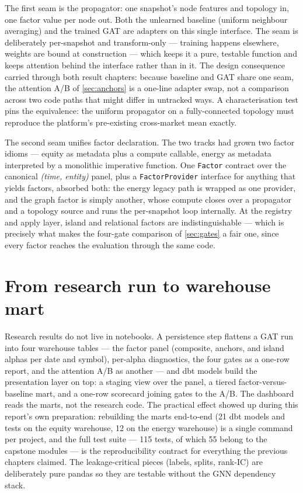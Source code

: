 The first seam is the propagator: one snapshot's node features and
topology in, one factor value per node out. Both the unlearned baseline
(uniform neighbour averaging) and the trained GAT are adapters on this
single interface. The seam is deliberately per-snapshot and
transform-only --- training happens elsewhere, weights are bound at
construction --- which keeps it a pure, testable function and keeps
attention behind the interface rather than in it. The design consequence
carried through both result chapters: because baseline and GAT share one
seam, the attention A/B of \cref{sec:anchors} is a one-line adapter
swap, not a comparison across two code paths that might differ in
untracked ways. A characterisation test pins the equivalence: the
uniform propagator on a fully-connected topology must reproduce the
platform's pre-existing cross-market mean exactly.

The second seam unifies factor declaration. The two tracks had grown two
factor idioms --- equity as metadata plus a compute callable, energy as
metadata interpreted by a monolithic imperative function. One
\texttt{Factor} contract over the canonical \emph{(time, entity)} panel,
plus a \texttt{FactorProvider} interface for anything that yields
factors, absorbed both: the energy legacy path is wrapped as one
provider, and the graph factor is simply another, whose compute closes
over a propagator and a topology source and runs the per-snapshot loop
internally. At the registry and apply layer, island and relational
factors are indistinguishable --- which is precisely what makes the
four-gate comparison of \cref{sec:gates} a fair one, since every factor
reaches the evaluation through the same code.

\section{From research run to warehouse mart}
\label{sec:pl-loop}

Research results do not live in notebooks. A persistence step flattens a
GAT run into four warehouse tables --- the factor panel (composite,
anchors, and island alphas per date and symbol), per-alpha diagnostics,
the four gates as a one-row report, and the attention A/B as another ---
and dbt models build the presentation layer on top: a staging view over
the panel, a tiered factor-versus-baseline mart, and a one-row scorecard
joining gates to the A/B. The dashboard reads the marts, not the
research code. The practical effect showed up during this report's own
preparation: rebuilding the marts end-to-end (21 dbt models and tests on
the equity warehouse, 12 on the energy warehouse) is a single command
per project, and the full test suite --- 115 tests, of which 55 belong
to the capstone modules --- is the reproducibility contract for
everything the previous chapters claimed. The leakage-critical pieces
(labels, splits, rank-IC) are deliberately pure pandas so they are
testable without the GNN dependency stack.
